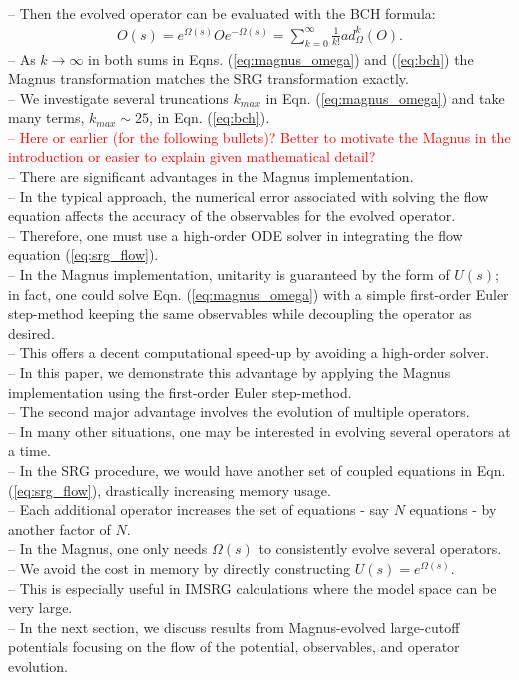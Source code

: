 \documentclass[preprintnumbers,floatfix,aps,prc,preprint,nofootinbib]{revtex4-1}
\begin{document}
\\
-- Then the evolved operator can be evaluated with the BCH formula:
%
\begin{eqnarray}
	\label{eq:bch}
	O(s) = e^{\Omega(s)} O e^{-\Omega(s)} = \sum_{k=0}^{\infty} \frac{1}{k!} ad_{\Omega}^{k}(O).
\end{eqnarray}
%
-- As $k \rightarrow \infty$ in both sums in Eqns. (\ref{eq:magnus_omega}) and (\ref{eq:bch}) the Magnus transformation matches the SRG transformation exactly.
\\
-- We investigate several truncations $k_{max}$ in Eqn. (\ref{eq:magnus_omega}) and take many terms, $k_{max} \sim 25$, in Eqn. (\ref{eq:bch}).
\\
\textcolor{red}{%
-- Here or earlier (for the following bullets)? Better to motivate the Magnus in the introduction or easier to explain given mathematical detail?
}
\\
-- There are significant advantages in the Magnus implementation.
\\
-- In the typical approach, the numerical error associated with solving the flow equation affects the accuracy of the observables for the evolved operator.
\\
-- Therefore, one must use a high-order ODE solver in integrating the flow equation (\ref{eq:srg_flow}).
\\
-- In the Magnus implementation, unitarity is guaranteed by the form of $U(s)$; in fact, one could solve Eqn. (\ref{eq:magnus_omega}) with a simple first-order Euler step-method keeping the same observables while decoupling the operator as desired.
\\
-- This offers a decent computational speed-up by avoiding a high-order solver.
\\
-- In this paper, we demonstrate this advantage by applying the Magnus implementation using the first-order Euler step-method.
\\
-- The second major advantage involves the evolution of multiple operators.
\\
-- In many other situations, one may be interested in evolving several operators at a time.
\\
-- In the SRG procedure, we would have another set of coupled equations in Eqn. (\ref{eq:srg_flow}), drastically increasing memory usage.
\\
-- Each additional operator increases the set of equations - say $N$ equations - by another factor of $N$.
\\
-- In the Magnus, one only needs $\Omega(s)$ to consistently evolve several operators.
\\
-- We avoid the cost in memory by directly constructing $U(s)=e^{\Omega(s)}$.
\\
-- This is especially useful in IMSRG calculations where the model space can be very large.
\\
-- In the next section, we discuss results from Magnus-evolved large-cutoff potentials focusing on the flow of the potential, observables, and operator evolution.
\end{document}

